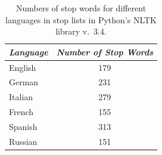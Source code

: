 \begin{table}[H]
\centering
\caption{Numbers of stop words for different languages in stop lists in Python’s NLTK library v.~3.4.} 
\vspace{2em}
\begin{tabular}{l|c}
\hline
\textit{Language} & \textit{Number of Stop Words} \\
\hline
English & 179 \\
German & 231 \\
Italian & 279 \\
French & 155 \\
Spanish & 313 \\
Russian & 151 \\
\hline
\end{tabular}
\end{table}

